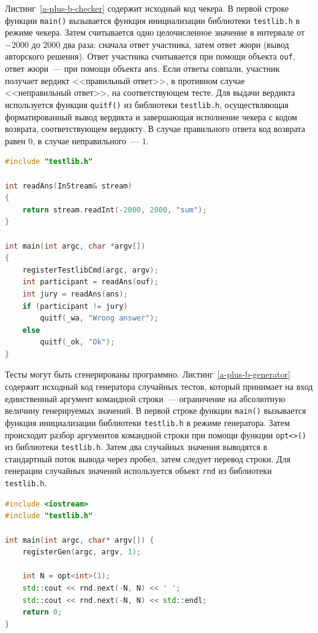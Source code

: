\documentclass[times,specification,annotation]{style/itmo-student-thesis/itmo-student-thesis}
\begin{document}
Листинг~\ref{a-plus-b-checker} содержит исходный код чекера. В первой строке функции \texttt{main()} вызывается функция инициализации библиотеки \texttt{testlib.h} в режиме чекера. Затем считывается одно целочисленное значение в интервале от $-2000$ до $2000$ два раза: сначала ответ участника, затем ответ жюри (вывод авторского решения). Ответ участника считывается при помощи объекта \texttt{ouf}, ответ жюри~--- при помощи объекта \texttt{ans}. Если ответы совпали, участник получает вердикт <<правильный ответ>>, в противном случае <<неправильный ответ>>, на соответствующем тесте. Для выдачи вердикта используется функция \texttt{quitf()} из библиотеки \texttt{testlib.h}, осуществляющая форматированный вывод вердикта и завершающая исполнение чекера с кодом возврата, соответствующем вердикту. В случае правильного ответа код возврата равен $0$, в случае неправильного~--- $1$.

\begin{lstlisting}[float=!h,caption={Пример чекера},label={a-plus-b-checker},language=c++]
#include "testlib.h"

int readAns(InStream& stream)
{
    return stream.readInt(-2000, 2000, "sum");
}

int main(int argc, char *argv[])
{
    registerTestlibCmd(argc, argv);
    int participant = readAns(ouf);
    int jury = readAns(ans);
    if (participant != jury)
        quitf(_wa, "Wrong answer");
    else
        quitf(_ok, "Ok");
}
\end{lstlisting}

Тесты могут быть сгенерированы программно. Листинг~\ref{a-plus-b-generator} содержит исходный код генератора случайных тестов, который принимает на вход единственный аргумент командной строки~--- ограничение на абсолютную величину генерируемых значений. В первой строке функции \texttt{main()} вызывается функция инициализации библиотеки \texttt{testlib.h} в режиме генератора. Затем происходит разбор аргументов командной строки при помощи функции \texttt{opt<>()} из библиотеки \texttt{testlib.h}. Затем два случайных значения выводятся в стандартный поток вывода через пробел, затем следует перевод строки. Для генерации случайных значений используется объект \texttt{rnd} из библиотеки \texttt{testlib.h}.

\begin{lstlisting}[float=!h,caption={Пример генератора},label={a-plus-b-generator},language=c++]
#include <iostream>
#include "testlib.h"
 
int main(int argc, char* argv[]) {
    registerGen(argc, argv, 1);
 
    int N = opt<int>(1);
    std::cout << rnd.next(-N, N) << ' ';
    std::cout << rnd.next(-N, N) << std::endl;
    return 0;
}
\end{lstlisting}
\end{document}
